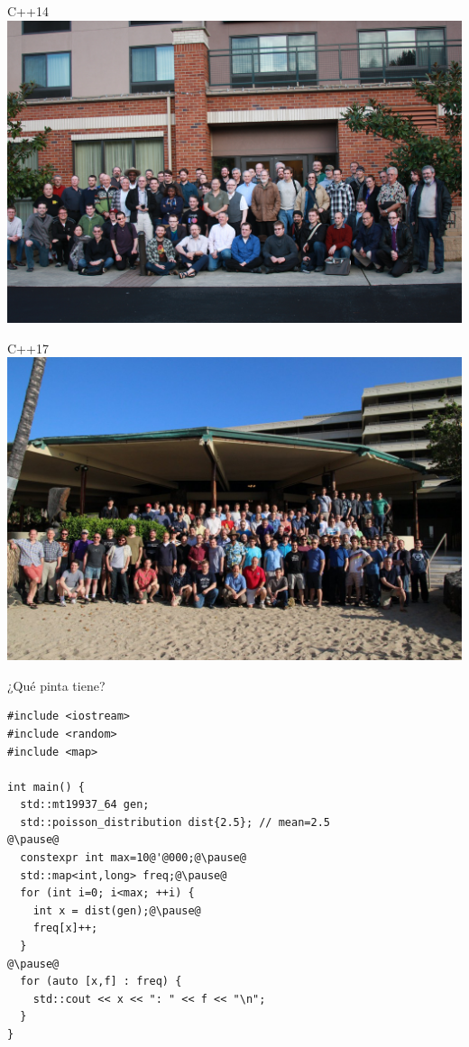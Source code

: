 \begin{frame}[t]{C++14}
\includegraphics[width=\textwidth]{img/cpp-14.jpg}
\end{frame}

\begin{frame}[t]{C++17}
\includegraphics[width=\textwidth]{img/cpp-17.jpg}
\end{frame}

\begin{frame}[t,fragile]{¿Qué pinta tiene?}
	\begin{lstlisting}[escapechar=@]
#include <iostream>
#include <random>
#include <map>

int main() {
  std::mt19937_64 gen;
  std::poisson_distribution dist{2.5}; // mean=2.5
@\pause@
  constexpr int max=10@'@000;@\pause@
  std::map<int,long> freq;@\pause@
  for (int i=0; i<max; ++i) {
    int x = dist(gen);@\pause@
    freq[x]++;
  }
@\pause@
  for (auto [x,f] : freq) {
    std::cout << x << ": " << f << "\n";
  }
}
\end{lstlisting}
\end{frame}

